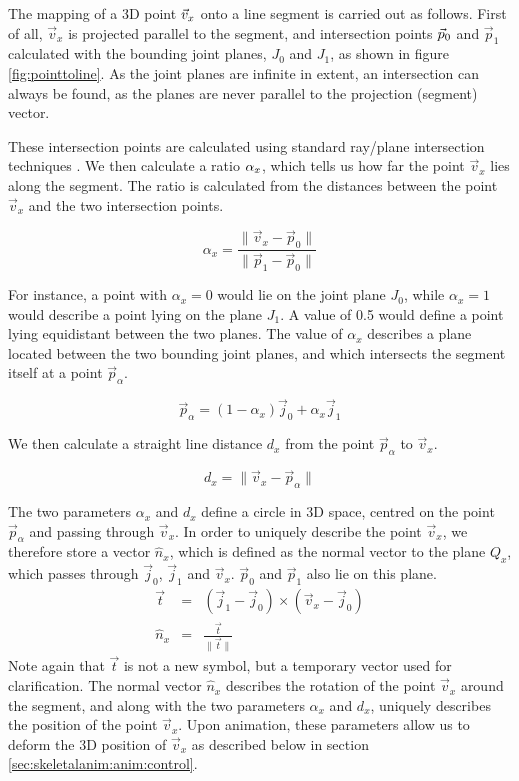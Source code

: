 The mapping of a 3D point $\vec{v}_x\symbol{vertex}$ onto a line segment is carried out as follows. First of all, $\vec{v}_x$ is projected parallel to the segment, and intersection points $\vec{p}_0\symbol{point}$ and $\vec{p}_1$ calculated with the bounding joint planes, $J_0$ and $J_1$, as shown in figure \ref{fig:pointtoline}.  As the joint planes are infinite in extent, an intersection can always be found, as the planes are never parallel to the projection (segment) vector. 

These intersection points are calculated using standard ray/plane intersection techniques \cite{Lengyel02}. We then calculate a ratio $\alpha_x\symbol{alpha}$, which tells us how far the point $\vec{v}_x$ lies along the segment. The ratio is calculated from the distances between the point $\vec{v}_x$ and the two intersection points.

\begin{equation}
\alpha_x = \frac{\|\vec{v}_x-\vec{p}_0\|}{\|\vec{p}_1-\vec{p}_0\|}
\end{equation}

For instance, a point with $\alpha_x = 0$ would lie on the joint plane $J_0$, while $\alpha_x = 1$ would describe a point lying on the plane $J_1$. A value of 0.5 would define a point lying equidistant between the two planes. The value of $\alpha_x$ describes a plane located between the two bounding joint planes, and which intersects the segment itself at a point $\vec{p}_\alpha$.

\begin{equation} \label{eqn:palpha}
\vec{p}_\alpha = (1 - \alpha_x) \vec{j}_0 + \alpha_x \vec{j}_1
\end{equation}

We then calculate a straight line distance $d_x$ from the point $\vec{p}_\alpha$ to $\vec{v}_x$. 

\begin{equation}
d_x = \|\vec{v}_x - \vec{p}_\alpha\|
\end{equation}

The two parameters $\alpha_x$ and $d_x$ define a circle in 3D space, centred on the point $\vec{p}_\alpha$ and passing through $\vec{v}_x$. In order to uniquely describe the point $\vec{v}_x$, we therefore store a vector $\hat{n}_x$, which is defined as the normal vector to the plane $Q_x$, which passes through $\vec{j}_0$, $\vec{j}_1$ and $\vec{v}_x$. $\vec{p}_0$ and $\vec{p}_1$ also lie on this plane.
\begin{eqnarray}
\vec{t} & = & (\vec{j}_1 - \vec{j}_0) \times (\vec{v}_x - \vec{j}_0) \nonumber \\
\hat{n}_x & = & \frac{\vec{t}}{\|\vec{t}\|}
\end{eqnarray}
Note again that $\vec{t}$ is not a new symbol, but a temporary vector used for clarification. The normal vector $\hat{n}_x$ describes the rotation of the point $\vec{v}_x$ around the segment, and along with the two parameters $\alpha_x$ and $d_x$, uniquely describes the position of the point $\vec{v}_x$. Upon animation, these parameters allow us to deform the 3D position of $\vec{v}_x$ as described below in section \ref{sec:skeletalanim:anim:control}.

